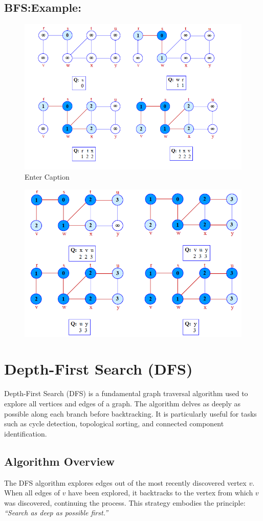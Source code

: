 \subsection{BFS:Example:}
\begin{figure}[h!]
    \centering
\includegraphics[width=0.6\linewidth]{BFS Ex. 1.png}
    \caption{Enter Caption}
    \label{fig:enter-label}
\end{figure}
\begin{figure} [h!]
    \centering
\includegraphics[width=0.6\linewidth]{BFS EX. 2.png}
    \caption{}
    \label{fig:enter-label}
\end{figure}
\section{Depth-First Search (DFS)}

Depth-First Search (DFS) is a fundamental graph traversal algorithm used to explore all vertices and edges of a graph. The algorithm delves as deeply as possible along each branch before backtracking. It is particularly useful for tasks such as cycle detection, topological sorting, and connected component identification.

\subsection{Algorithm Overview}
The DFS algorithm explores edges out of the most recently discovered vertex \(v\). When all edges of \(v\) have been explored, it backtracks to the vertex from which \(v\) was discovered, continuing the process. This strategy embodies the principle: \emph{``Search as deep as possible first.''}

